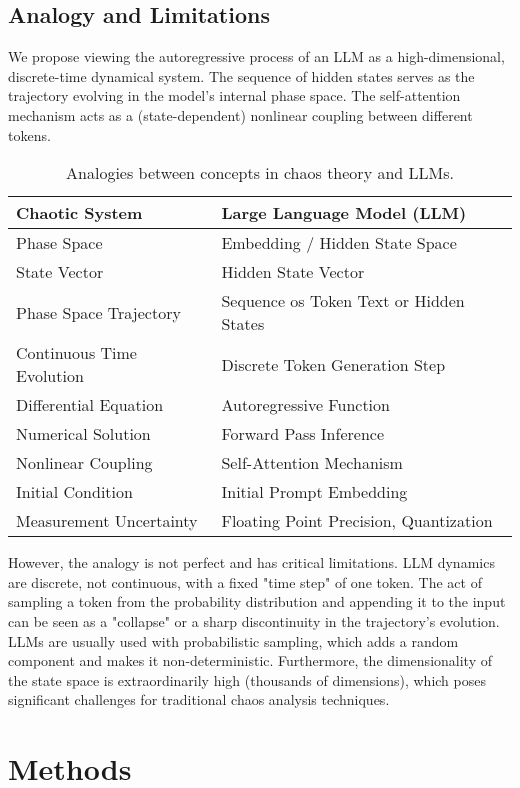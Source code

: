 \documentclass[a4paper,12pt]{article}
\begin{document}
\subsection{Analogy and Limitations}
We propose viewing the autoregressive process of an LLM as a high-dimensional, discrete-time dynamical system. The sequence of hidden states serves as the trajectory evolving in the model's internal phase space. The self-attention mechanism acts as a (state-dependent) nonlinear coupling between different tokens.

\begin{table}[H]
\centering
\begin{tabular}{@{}ll@{}}
\toprule
\textbf{Chaotic System} & \textbf{Large Language Model (LLM)} \\ \midrule
Phase Space & Embedding / Hidden State Space \\
State Vector & Hidden State Vector \\
Phase Space Trajectory & Sequence os Token Text or Hidden States \\
Continuous Time Evolution & Discrete Token Generation Step \\
Differential Equation & Autoregressive Function \\
Numerical Solution & Forward Pass Inference \\
Nonlinear Coupling & Self-Attention Mechanism \\
Initial Condition & Initial Prompt Embedding \\
Measurement Uncertainty & Floating Point Precision, Quantization \\ \bottomrule
\end{tabular}
\caption{Analogies between concepts in chaos theory and LLMs.}
\label{tab:analogy}
\end{table}

However, the analogy is not perfect and has critical limitations. LLM dynamics are discrete, not continuous, with a fixed "time step" of one token. The act of sampling a token from the probability distribution and appending it to the input can be seen as a "collapse" or a sharp discontinuity in the trajectory's evolution. LLMs are usually used with probabilistic sampling, which adds a random component and makes it non-deterministic. Furthermore, the dimensionality of the state space is extraordinarily high (thousands of dimensions), which poses significant challenges for traditional chaos analysis techniques.

\section{Methods}
\end{document}
